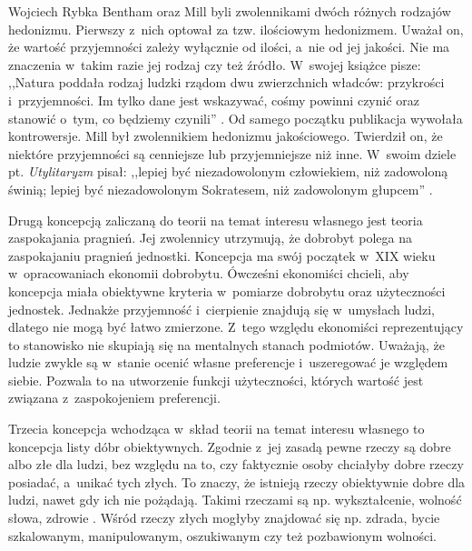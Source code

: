 \begin{artplenv}{Wojciech Rybka}
Bentham oraz Mill byli zwolennikami dwóch różnych rodzajów hedonizmu. Pierwszy z~nich optował za tzw. ilościowym
hedonizmem. Uważał on, że wartość przyjemności zależy wyłącznie od ilości, a~nie od jej jakości. Nie ma
znaczenia w~takim razie jej rodzaj czy też źródło. W~swojej książce pisze: ,,Natura poddała rodzaj ludzki rządom dwu zwierzchnich
władców: przykrości i~przyjemności. Im tylko dane jest wskazywać, cośmy powinni czynić oraz stanowić o~tym, co będziemy
czynili''
\parencite[s.~17]{bentham_wprowadzenie_1958}.
Od samego początku publikacja wywołała kontrowersje. Mill był
zwolennikiem hedonizmu jakościowego. Twierdził on, że niektóre przyjemności są cenniejsze lub przyjemniejsze niż inne.
W~swoim dziele pt. \textit{Utylitaryzm} pisał: ,,lepiej być niezadowolonym człowiekiem, niż zadowoloną świnią; lepiej
być niezadowolonym Sokratesem, niż zadowolonym głupcem''
\parencite[s.~18]{mill_utylitaryzm:_1959}.

\enlargethispage{1\baselineskip}

Drugą koncepcją zaliczaną do teorii na temat interesu własnego jest teoria zaspokajania pragnień. Jej zwolennicy
utrzymują, że dobrobyt polega na zaspokajaniu pragnień jednostki. Koncepcja ma swój początek w~XIX
wieku w~opracowaniach ekonomii dobrobytu. Ówcześni ekonomiści chcieli, aby koncepcja miała obiektywne kryteria w~pomiarze
dobrobytu oraz użyteczności jednostek. Jednakże przyjemność i~cierpienie znajdują się w~umysłach ludzi, dlatego nie
mogą być łatwo zmierzone. Z~tego względu ekonomiści reprezentujący to stanowisko nie skupiają się na mentalnych stanach
podmiotów. Uważają, że ludzie zwykle są w~stanie ocenić własne preferencje i~uszeregować je względem siebie. Pozwala to
na utworzenie funkcji użyteczności, których wartość jest związana z~zaspokojeniem preferencji.

Trzecia koncepcja wchodząca w~skład teorii na temat interesu własnego to koncepcja listy dóbr obiektywnych.
Zgodnie z~jej zasadą pewne rzeczy są dobre albo złe dla ludzi, bez względu na to, czy faktycznie osoby chciałyby dobre rzeczy
posiadać, a~unikać tych złych. To znaczy, że istnieją rzeczy obiektywnie dobre dla ludzi, nawet gdy ich nie pożądają.
Takimi rzeczami są np. wykształcenie, wolność słowa, zdrowie
\parencite{mill_utylitaryzm:_1959}.
Wśród rzeczy złych
mogłyby znajdować się np. zdrada, bycie szkalowanym, manipulowanym, oszukiwanym czy też pozbawionym wolności. 


\end{artplenv}
